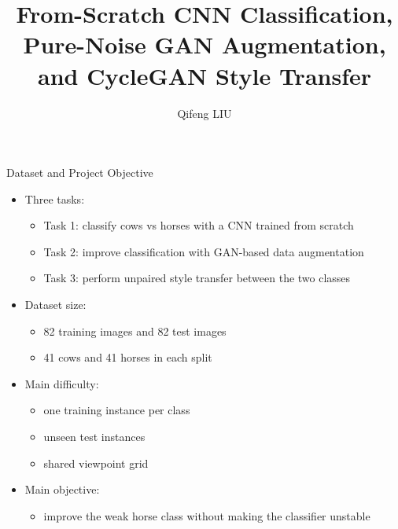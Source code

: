 \documentclass[aspectratio=169]{beamer}
\title[Machine Vision Project]{From-Scratch CNN Classification, Pure-Noise GAN Augmentation, and CycleGAN Style Transfer}
\author[Qifeng LIU]{Qifeng LIU}
\date{}
\begin{document}
\begin{frame}
  \titlepage
\end{frame}

\begin{frame}{Dataset and Project Objective}
\small
\begin{itemize}
  \item Three tasks:
  \begin{itemize}
    \item Task 1: classify cows vs horses with a CNN trained from scratch
    \item Task 2: improve classification with GAN-based data augmentation
    \item Task 3: perform unpaired style transfer between the two classes
  \end{itemize}
  \item Dataset size:
  \begin{itemize}
    \item 82 training images and 82 test images
    \item 41 cows and 41 horses in each split
  \end{itemize}
  \item Main difficulty:
  \begin{itemize}
    \item one training instance per class
    \item unseen test instances
    \item shared viewpoint grid
  \end{itemize}
  \item Main objective:
  \begin{itemize}
    \item improve the weak horse class without making the classifier unstable
  \end{itemize}
\end{itemize}
\end{frame}
\end{document}
